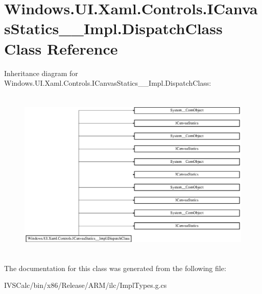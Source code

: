 \hypertarget{class_windows_1_1_u_i_1_1_xaml_1_1_controls_1_1_i_canvas_statics_____impl_1_1_dispatch_class}{}\section{Windows.\+U\+I.\+Xaml.\+Controls.\+I\+Canvas\+Statics\+\_\+\+\_\+\+Impl.\+Dispatch\+Class Class Reference}
\label{class_windows_1_1_u_i_1_1_xaml_1_1_controls_1_1_i_canvas_statics_____impl_1_1_dispatch_class}
Inheritance diagram for Windows.\+U\+I.\+Xaml.\+Controls.\+I\+Canvas\+Statics\+\_\+\+\_\+\+Impl.\+Dispatch\+Class\+:\begin{figure}[H]
\begin{center}
\leavevmode
\includegraphics[height=8.213333cm]{class_windows_1_1_u_i_1_1_xaml_1_1_controls_1_1_i_canvas_statics_____impl_1_1_dispatch_class}
\end{center}
\end{figure}


The documentation for this class was generated from the following file\+:\begin{DoxyCompactItemize}
\item 
I\+V\+S\+Calc/bin/x86/\+Release/\+A\+R\+M/ilc/Impl\+Types.\+g.\+cs\end{DoxyCompactItemize}
